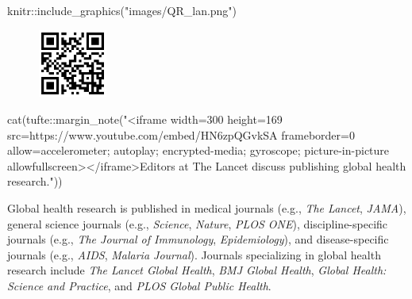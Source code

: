 \documentclass[
  letterpaper,
  DIV=11,
  numbers=noendperiod,
  oneside]{scrartcl}
\newenvironment{Shaded}{\begin{snugshade}}{\end{snugshade}}
\newcommand{\FunctionTok}[1]{\textcolor[rgb]{0.28,0.35,0.67}{#1}}
\newcommand{\NormalTok}[1]{\textcolor[rgb]{0.00,0.23,0.31}{#1}}
\newcommand{\SpecialCharTok}[1]{\textcolor[rgb]{0.37,0.37,0.37}{#1}}
\newcommand{\StringTok}[1]{\textcolor[rgb]{0.13,0.47,0.30}{#1}}
\begin{document}
\begin{Shaded}
\begin{Highlighting}[]
\NormalTok{knitr}\SpecialCharTok{::}\FunctionTok{include\_graphics}\NormalTok{(}\StringTok{"images/QR\_lan.png"}\NormalTok{)}
\end{Highlighting}
\end{Shaded}

\begin{figure}[H]

{\centering \includegraphics[width=0.2\textwidth,height=\textheight]{images/QR_lan.png}

}

\end{figure}

\begin{Shaded}
\begin{Highlighting}[]
\FunctionTok{cat}\NormalTok{(tufte}\SpecialCharTok{::}\FunctionTok{margin\_note}\NormalTok{(}\StringTok{"\textless{}iframe width=\textquotesingle{}300\textquotesingle{} height=\textquotesingle{}169\textquotesingle{} src=\textquotesingle{}https://www.youtube.com/embed/HN6zpQGvkSA\textquotesingle{} frameborder=\textquotesingle{}0\textquotesingle{} allow=\textquotesingle{}accelerometer; autoplay; encrypted{-}media; gyroscope; picture{-}in{-}picture\textquotesingle{} allowfullscreen\textgreater{}\textless{}/iframe\textgreater{}Editors at The Lancet discuss publishing global health research."}\NormalTok{))}
\end{Highlighting}
\end{Shaded}

Global health research is published in medical journals (e.g., \emph{The
Lancet}, \emph{JAMA}), general science journals (e.g., \emph{Science},
\emph{Nature}, \emph{PLOS ONE}), discipline-specific journals (e.g.,
\emph{The Journal of Immunology}, \emph{Epidemiology}), and
disease-specific journals (e.g., \emph{AIDS}, \emph{Malaria Journal}).
Journals specializing in global health research include \emph{The Lancet
Global Health}, \emph{BMJ Global Health}, \emph{Global Health: Science
and Practice}, and \emph{PLOS Global Public Health}.
\end{document}
